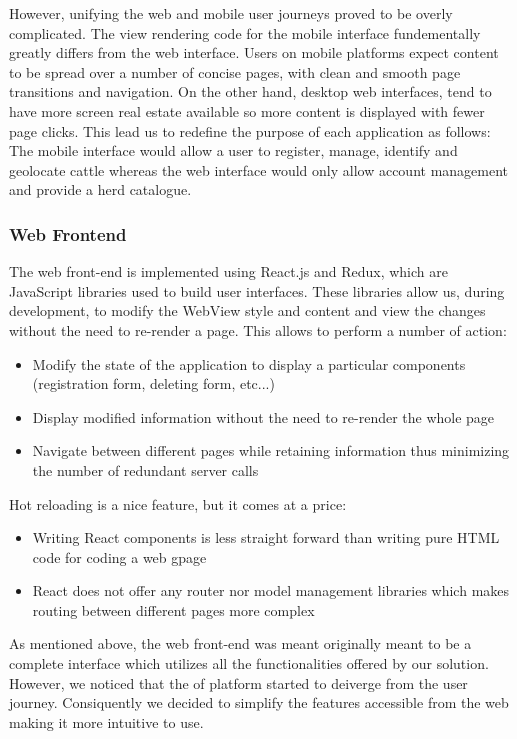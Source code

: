 However, unifying the web and mobile user journeys proved to be overly complicated. The view rendering code for the mobile interface fundementally greatly differs from the web interface. Users on mobile platforms expect content to be spread over a number of concise pages, with clean and smooth page transitions and navigation. On the other hand, desktop web interfaces, tend to have more screen real estate available so more content is displayed with fewer page clicks. This lead us to redefine the purpose of each application as follows: The mobile interface would allow a user to register, manage, identify and geolocate cattle whereas the web interface would only allow account management and provide a herd catalogue.

\subsubsection{Web Frontend}
The web front-end is implemented using React.js and Redux, which are JavaScript libraries used to build user interfaces. These libraries allow us, during development, to modify the WebView style and content and view the changes without the need to re-render a page. This allows to perform a number of action:

\begin{itemize}
	\item Modify the state of the application to display a particular components (registration form, deleting form, etc...)
	\item Display modified information without the need to re-render the whole page
	\item Navigate between different pages while retaining information thus minimizing the number of redundant server calls
\end{itemize}

Hot reloading is a nice feature, but it comes at a price:
\begin{itemize}
	\item Writing React components is less straight forward than writing pure HTML code for coding a web gpage
	\item React does not offer any router nor model management libraries which makes routing between different pages more complex
\end{itemize}

As mentioned above, the web front-end was meant originally meant to be a complete interface which utilizes all the functionalities offered by our solution. However, we noticed that the of platform started to deiverge from the user journey. Consiquently we decided to simplify the features accessible from the web making it more intuitive to use.

